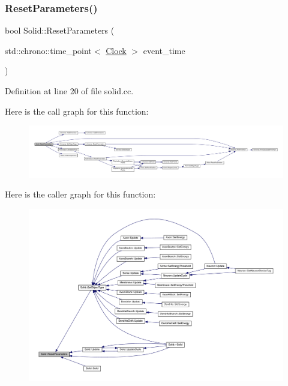 \subsubsection{\texorpdfstring{Reset\+Parameters()}{ResetParameters()}}
{\footnotesize\ttfamily bool Solid\+::\+Reset\+Parameters (\begin{DoxyParamCaption}\item[{std\+::chrono\+::time\+\_\+point$<$ \hyperlink{universe_8h_a0ef8d951d1ca5ab3cfaf7ab4c7a6fd80}{Clock} $>$}]{event\+\_\+time }\end{DoxyParamCaption})}



Definition at line 20 of file solid.\+cc.

Here is the call graph for this function\+:
\nopagebreak
\begin{figure}[H]
\begin{center}
\leavevmode
\includegraphics[width=350pt]{class_solid_ac43dc78fa7f6a3348fc99751ff6bbc52_cgraph}
\end{center}
\end{figure}
Here is the caller graph for this function\+:
\nopagebreak
\begin{figure}[H]
\begin{center}
\leavevmode
\includegraphics[width=350pt]{class_solid_ac43dc78fa7f6a3348fc99751ff6bbc52_icgraph}
\end{center}
\end{figure}
\mbox{\label{class_solid_a37503e6b25f912254414e778af2e75cd}} 
